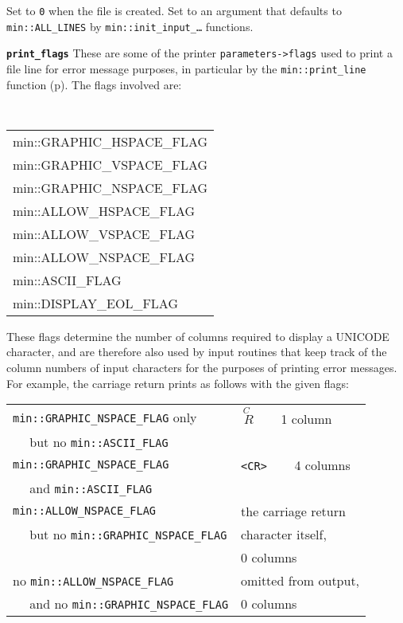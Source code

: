 \documentclass[12pt]{article}
\makeatletter
\newcommand{\ttmkey}[2]{{\tt \bf #1}\index{#1@{\tt #1}!#2}}
\newcommand{\pagref}[1]{p\pageref{#1}}
\newcommand{\EOL}{\penalty \exhyphenpenalty}
\newenvironment{indpar}[1][0.3in]%
	{\begin{list}{}%
		     {\setlength{\itemsep}{0in}%
		      \setlength{\topsep}{0in}%
		      \setlength{\parsep}{1ex}%
		      \setlength{\labelwidth}{#1}%
		      \setlength{\leftmargin}{#1}%
		      \addtolength{\leftmargin}{\labelsep}}%
	 \item}%
	{\end{list}}
\newenvironment{itemlist}[1][1.2in]%
	{\begin{list}{}{\setlength{\labelwidth}{#1}%
		        \setlength{\leftmargin}{\labelwidth}%
		        \addtolength{\leftmargin}{+0.2in}%
		        \renewcommand{\makelabel}[1]{##1\hfill}}}%
	{\end{list}}
\makeatother
\begin{document}
\begin{itemlist}[1.4in]
Set to {\tt 0} when the file is created.  Set to an argument
that defaults to {\tt min::\EOL ALL\_\EOL LINES}
by {\tt min::\EOL init\_\EOL input\_\ldots} functions.

\item[\ttmkey{print\_\EOL flags}{in {\tt min::file}}]\label{FILE_PRINT_FLAGS}
These are some of the printer {\tt parameters->\EOL flags} used to print
a file line for error message purposes,
in particular by the {\tt min::\EOL print\_\EOL line}
function (\pagref{MIN::PRINT_LINE}).
The flags involved are:
\begin{indpar}
\tt
\begin{tabular}{l}
min::GRAPHIC\_HSPACE\_FLAG \\
min::GRAPHIC\_VSPACE\_FLAG \\
min::GRAPHIC\_NSPACE\_FLAG \\
min::ALLOW\_HSPACE\_FLAG \\
min::ALLOW\_VSPACE\_FLAG \\
min::ALLOW\_NSPACE\_FLAG \\
min::ASCII\_FLAG \\
min::DISPLAY\_EOL\_FLAG
\end{tabular}
\end{indpar}

These flags determine the number of columns required to display a
UNICODE character, and are therefore also used by input routines
that keep track of the column numbers of input characters for
the purposes of printing error messages.  For example, the carriage
return prints as follows with the given flags:
\begin{center}
\begin{tabular}{l@{~~~~}l}
{\tt min::GRAPHIC\_NSPACE\_FLAG} only
	& {\tiny $\stackrel{\textstyle C~}{~R}$} ~~~ 1 column \\
~~ but no {\tt min::ASCII\_FLAG}
\\[1ex]
{\tt min::GRAPHIC\_NSPACE\_FLAG} & {\tt <CR>} ~~~ 4 columns \\
~~ and {\tt min::ASCII\_FLAG}
\\[1ex]
{\tt min::ALLOW\_NSPACE\_FLAG}   & the carriage return \\
~~ but no {\tt min::GRAPHIC\_NSPACE\_FLAG} & character itself, \\
					   & 0 columns
\\[1ex]
no {\tt min::ALLOW\_NSPACE\_FLAG}   & omitted from output, \\
~~ and no {\tt min::GRAPHIC\_NSPACE\_FLAG}  & 0 columns
\end{tabular}
\end{center}


\end{itemlist}
\end{document}
